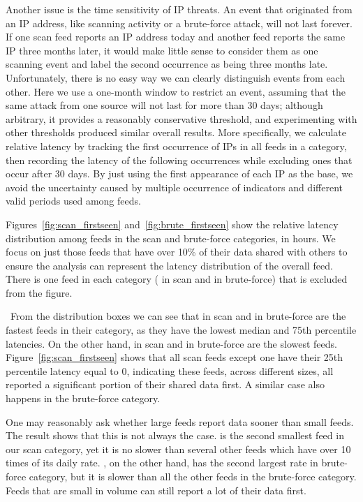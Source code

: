 Another issue is the time sensitivity of IP threats. An event that originated from
an IP address, like scanning activity or a brute-force attack, will not last
forever. If one scan feed reports an IP address today and another feed reports
the same IP three months later, it would make little sense to consider them as one
scanning event and label the second occurrence as being three months late.
Unfortunately, there is no easy way we can clearly distinguish events from each
other. Here we use a one-month window to restrict an event, assuming that the same
attack from one source will not last for more than 30 days; although arbitrary, it provides a reasonably conservative threshold, and experimenting with other thresholds produced similar overall results. More specifically, we calculate relative latency by tracking the
first occurrence of IPs in all feeds in a category, then recording the latency of the
following occurrences while excluding ones that occur after 30 days. By just
using the first appearance of each IP as the base, we avoid the uncertainty caused by
multiple occurrence of indicators and different valid periods used among feeds.


Figures~\ref{fig:scan_firstseen} and~\ref{fig:brute_firstseen} show the relative
latency distribution among feeds in the scan and brute-force categories, in hours. We focus on just those feeds that have
over 10\% of their data shared with others to ensure the analysis can represent the latency
distribution of the overall feed. There is one feed in each category ({\feedTSSnort}
in scan and {\feedTSBrute} in brute-force) that is excluded from the figure.

\finding\
From the distribution boxes we can see that {\feedetiprep} in scan and {\feedbadipssh}
in brute-force are the fastest feeds in their category, as they have the lowest median
and 75th percentile latencies. On the other hand, {\feedTSAnalyst} in scan and
{\feedbadipbot} in brute-force are the slowest feeds. Figure~\ref{fig:scan_firstseen}
shows that all scan feeds except one have their 25th percentile latency equal to 0, indicating
these feeds, across different sizes, all reported a significant portion of their shared
data first. A similar case also happens in the brute-force category.


One may reasonably ask whether large feeds report data sooner than small feeds.
The result shows that this is not always the case. {\feedFBBasecamp} is the second smallest
feed in our scan category, yet it is no slower than several other feeds which have over 10 times of its daily rate.
{\feedbadipbot}, on the other hand, has the second largest rate in brute-force
category, but it is slower than all the other feeds in the brute-force category. Feeds that are small in volume can still report a lot of their data first.

